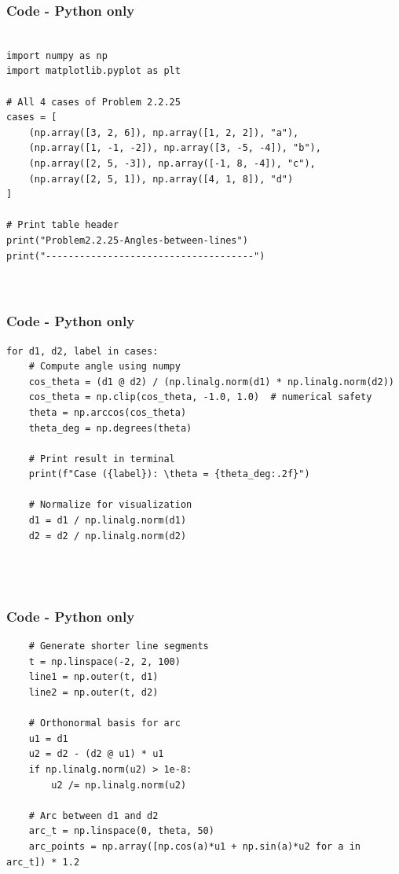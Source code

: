 \documentclass{beamer}
\theoremstyle{remark}
\numberwithin{equation}{section}
\begin{document}
\begin{frame}[fragile]
\frametitle{Code - Python only}
\begin{lstlisting}

import numpy as np
import matplotlib.pyplot as plt

# All 4 cases of Problem 2.2.25
cases = [
    (np.array([3, 2, 6]), np.array([1, 2, 2]), "a"),
    (np.array([1, -1, -2]), np.array([3, -5, -4]), "b"),
    (np.array([2, 5, -3]), np.array([-1, 8, -4]), "c"),
    (np.array([2, 5, 1]), np.array([4, 1, 8]), "d")
]

# Print table header
print("Problem2.2.25-Angles-between-lines")
print("-------------------------------------")



\end{lstlisting}
\end{frame}
\begin{frame}[fragile]
\frametitle{Code - Python only}
\begin{lstlisting}
for d1, d2, label in cases:
    # Compute angle using numpy
    cos_theta = (d1 @ d2) / (np.linalg.norm(d1) * np.linalg.norm(d2))
    cos_theta = np.clip(cos_theta, -1.0, 1.0)  # numerical safety
    theta = np.arccos(cos_theta)
    theta_deg = np.degrees(theta)

    # Print result in terminal
    print(f"Case ({label}): \theta = {theta_deg:.2f}")

    # Normalize for visualization
    d1 = d1 / np.linalg.norm(d1)
    d2 = d2 / np.linalg.norm(d2)




\end{lstlisting}
\end{frame}

\begin{frame}[fragile]
\frametitle{Code - Python only}
\begin{lstlisting}
    # Generate shorter line segments
    t = np.linspace(-2, 2, 100)
    line1 = np.outer(t, d1)
    line2 = np.outer(t, d2)

    # Orthonormal basis for arc
    u1 = d1
    u2 = d2 - (d2 @ u1) * u1
    if np.linalg.norm(u2) > 1e-8:
        u2 /= np.linalg.norm(u2)

    # Arc between d1 and d2
    arc_t = np.linspace(0, theta, 50)
    arc_points = np.array([np.cos(a)*u1 + np.sin(a)*u2 for a in arc_t]) * 1.2



\end{lstlisting}
\end{frame}
\end{document}
